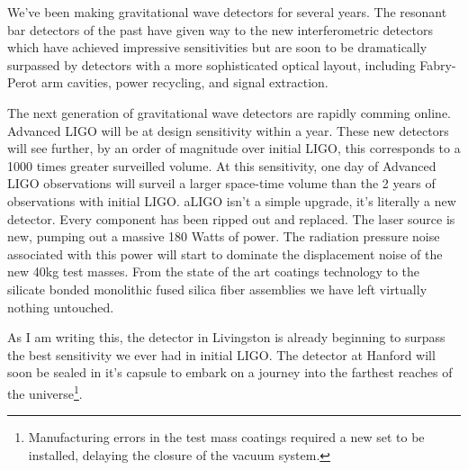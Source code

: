 

%

We've been making gravitational wave detectors for several years.
The resonant bar detectors of the past have given way to the new
interferometric detectors which have achieved impressive sensitivities
but are soon to be dramatically surpassed
by detectors with a more sophisticated optical layout, including Fabry-Perot
arm cavities, power recycling, and signal extraction.


The next generation of gravitational wave detectors are rapidly comming
online.
Advanced LIGO will be at design sensitivity within a year.
These new detectors will see further, by an order of magnitude over
initial LIGO, this corresponds to a 1000 times greater surveilled volume.
At this sensitivity, one day of Advanced LIGO observations will surveil a
larger space-time volume than the 2 years of observations with initial LIGO.
aLIGO isn't a simple upgrade, it's literally a new detector.
Every component has been ripped out and replaced.
The laser source is new, pumping out a massive
180 Watts of power.
The radiation pressure noise associated with this power will start to
dominate the displacement noise of the new 40kg test masses.
From the state of the art coatings technology to the silicate bonded
monolithic fused silica fiber assemblies we have left virtually
nothing untouched.

As I am writing this,
the detector in Livingston is already beginning to surpass the
best sensitivity we ever had in initial LIGO. The detector at Hanford will
soon be sealed in it's capsule to embark on a journey into the farthest
reaches of the
universe\footnote{Manufacturing errors in the test mass coatings required a new
set to be installed, delaying the closure of the vacuum system.}.

